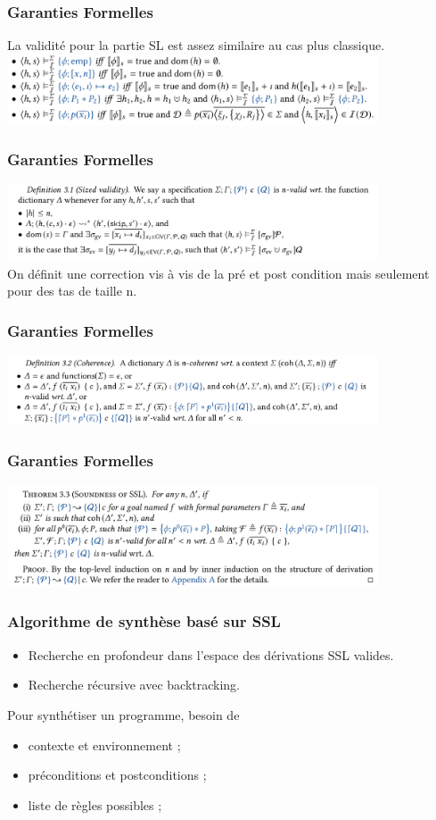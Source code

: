 \documentclass[french]{beamer}
\begin{document}
\begin{frame}[fragile]
	\frametitle{Garanties Formelles}
	La validité pour la partie SL est assez similaire au cas plus classique.\\
	\vspace{0.5cm}
	\includegraphics[width=11cm]{figures/satisfaction.png}
\end{frame}
\begin{frame}[fragile]
	\frametitle{Garanties Formelles}
	\includegraphics[width=11cm]{figures/nvalid.png}\\
	
	On définit une correction vis à vis de la pré et post condition mais seulement pour des tas de taille n.
\end{frame}
\begin{frame}[fragile]
	\frametitle{Garanties Formelles}
	\includegraphics[width=11cm]{figures/coherence.png}
\end{frame}
\begin{frame}[fragile]
	\frametitle{Garanties Formelles}
	\includegraphics[width=11cm]{figures/thm.png}
\end{frame}
\begin{frame}[fragile]
	\frametitle{Algorithme de synthèse basé sur SSL}
   \begin{itemize}
      \item Recherche en profondeur dans l'espace des dérivations SSL valides.
      \item Recherche récursive avec backtracking.
   \end{itemize}
   Pour synthétiser un programme, besoin de
   \begin{itemize}
       \item contexte et environnement ;
       \item préconditions et postconditions ;
       \item liste de règles possibles ;
   \end{itemize}
\end{frame}
\end{document}
